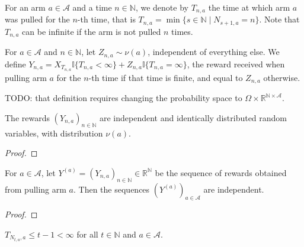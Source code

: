 \begin{definition}\label{def:timeOfPull}
For an arm $a \in \mathcal{A}$ and a time $n \in \mathbb{N}$, we denote by $T_{n,a}$ the time at which arm $a$ was pulled for the $n$-th time, that is $T_{n,a} = \min\{s \in \mathbb{N} \mid N_{s+1,a} = n\}$.
Note that $T_{n, a}$ can be infinite if the arm is not pulled $n$ times.
\end{definition}


\begin{definition}\label{def:altReward}
For $a \in \mathcal{A}$ and $n \in \mathbb{N}$, let $Z_{n,a} \sim \nu(a)$, independent of everything else.
We define $Y_{n, a} = X_{T_{n,a}} \mathbb{I}\{T_{n, a} < \infty\} + Z_{n,a} \mathbb{I}\{T_{n, a} = \infty\}$, the reward received when pulling arm $a$ for the $n$-th time if that time is finite, and equal to $Z_{n,a}$ otherwise.
\end{definition}

TODO: that definition requires changing the probability space to $\Omega \times \mathbb{R}^{\mathbb{N} \times \mathcal{A}}$.

\begin{lemma}\label{lem:iid_altReward}
The rewards $(Y_{n,a})_{n \in \mathbb{N}}$ are independent and identically distributed random variables, with distribution $\nu(a)$.
\end{lemma}

\begin{proof}

\end{proof}


\begin{lemma}\label{lem:indepednent_altReward}
For $a \in \mathcal{A}$, let $Y^{(a)} = (Y_{n,a})_{n \in \mathbb{N}} \in \mathbb{R}^{\mathbb{N}}$ be the sequence of rewards obtained from pulling arm $a$. Then the sequences $(Y^{(a)})_{a \in \mathcal{A}}$ are independent.
\end{lemma}

\begin{proof}

\end{proof}


\begin{lemma}\label{lem:timeOfPull_pullCount_le}
$T_{N_{t, a}, a} \le t - 1 < \infty$ for all $t \in \mathbb{N}$ and $a \in \mathcal{A}$.
\end{lemma}

